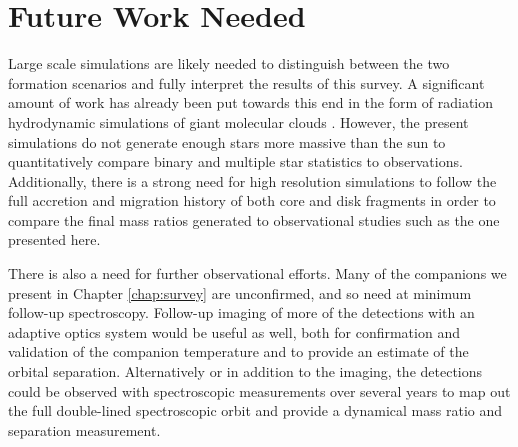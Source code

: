 \documentclass{utthesis}
\begin{document}
\section{Future Work Needed}

Large scale simulations are likely needed to distinguish between the two formation scenarios and fully interpret the results of this survey. A significant amount of work has already been put towards this end in the form of radiation hydrodynamic simulations of giant molecular clouds \citep{Bate2012, Krumholz2012}. However, the present simulations do not generate enough stars more massive than the sun to quantitatively compare binary and multiple star statistics to observations. Additionally, there is a strong need for high resolution simulations to follow the full accretion and migration history of both core and disk fragments in order to compare the final mass ratios generated to observational studies such as the one presented here.

There is also a need for further observational efforts. Many of the companions we present in Chapter \ref{chap:survey} are unconfirmed, and so need at minimum follow-up spectroscopy. Follow-up imaging of more of the detections with an adaptive optics system would be useful as well, both for confirmation and validation of the companion temperature and to provide an estimate of the orbital separation. Alternatively or in addition to the imaging, the detections could be observed with spectroscopic measurements over several years to map out the full double-lined spectroscopic orbit and provide a dynamical mass ratio and separation measurement. 








\backmatter

\printindex

\cleardoublepage
{}

\end{document}
